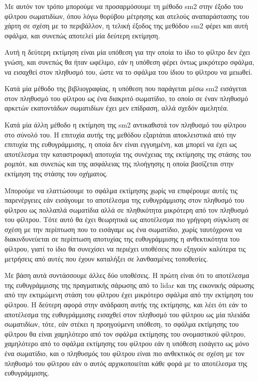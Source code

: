 \documentclass[a4paper,10pt]{article}
\begin{document}
Με αυτόν τον τρόπο μπορούμε να προσαρμόσουμε τη μέθοδο sm2 στην έξοδο του
φίλτρου σωματιδίων, όπου λόγω θορύβου μέτρησης και ατελούς αναπαράστασης του
χάρτη σε σχέση με το περιβάλλον, η τελική έξοδος της μεθόδου sm2 φέρει και αυτή
σφάλμα, και συνεπώς αποτελεί μία δεύτερη εκτίμηση.

Αυτή η δεύτερη εκτίμηση είναι μία υπόθεση για την οποία το ίδιο το φίλτρο δεν
έχει γνώση, και συνεπώς θα ήταν ωφέλιμο, εάν η υπόθεση φέρει όντως μικρότερο
σφάλμα, να εισαχθεί στον πληθυσμό του, ώστε να το σφάλμα του ίδιου το φίλτρου
να μειωθεί.

Κατά μία μέθοδο της βιβλιογραφίας, η υπόθεση που παράγεται μέσω sm2 εισάγεται
στον πληθυσμό του φίλτρου ως ένα διακριτό σωματίδιο, το οποίο σε έναν πληθυσμό
αρκετών εκατοντάδων σωματιδίων έχει μεν επίδραση, αλλά σχεδόν αμελητέα.

Κατά μία άλλη μέθοδο η εκτίμηση της sm2 αντικαθιστά τον πληθυσμό του φίλτρου
στο σύνολό του.  Η επιτυχία αυτής της μεθόδου εξαρτάται αποκλειστικά από την
επιτυχία της ευθυγράμμισης, η οποία δεν είναι εγγυημένη, και μπορεί να έχει ως
αποτέλεσμα την καταστροφική αποτυχία της συνέχειας της εκτίμησης της στάσης του
ρομπότ, και συνεπώς και της ασφάλειας της πλοήγησης η οποία βασίζεται στην
εκτίμηση της στάσης του οχήματος.

Μπορούμε να ελαττώσουμε το σφάλμα εκτίμησης χωρίς να επιφέρουμε αυτές
τις παρενέργειες εάν εισάγουμε το αποτέλεσμα της ευθυγράμμισης στον πληθυσμό
του φίλτρου ως πολλαπλά σωματίδια αλλά σε πληθικότητα μικρότερη από τον
πληθυσμό του φίλτρου. Τότε αυτό θα έχει θεωρητικά ως αποτέλεσμα πιο γρήγορη
σύγκλιση σε σχέση με την περίπτωση που το εισάγαμε ως ένα σωματίδιο, χωρίς
ταυτόχρονα να διακινδυνεύεται σε περίπτωση αποτυχίας της ευθυγράμμισης η
ανθεκτικότητα του φίλτρου, γιατί το ίδιο θα συνεχίσει να περιέχει υποθέσεις που
εξηγούν καλύτερα τις μετρήσεις από αυτές που έχουν καταλήξει σε λανθασμένες
τοποθεσίες.

Με βάση αυτά συντάσσουμε άλλες δύο υποθέσεις. Η πρώτη είναι ότι το αποτέλεσμα
της ευθυγράμμισης της πραγματικής σάρωσης από το lidar και της εικονικής
σάρωσης από την εκτιμώμενη στάση του φίλτρου έχει μικρότερο σφάλμα από την
εκτίμηση του φίλτρου.  Η δεύτερη αφορά στην ανάδραση αυτής της εκτίμησης, και
λέει ότι εάν το αποτέλεσμα της ευθυγράμμισης εισαχθεί στον πληθυσμό του φίλτρου
ως μία πλειάδα σωματιδίων, τότε, εάν στέκει η προηγούμενη υπόθεση, το σφάλμα
εκτίμησης του φίλτρου θα είναι χαμηλότερο από τον σφάλμα εκτίμησης του
ονομαστικού φίλτρου, χαμηλότερο από το σφάλμα εκτίμησης του φίλτρου εάν η
υπόθεση εισάγετο ως μόνο ένα σωματίδιο, και ο πληθυσμός του φίλτρου είναι πιο
ανθεκτικός σε σχέση με τον πληθυσμό του φίλτρου εάν ο αυτός αρχικοποιείται κάθε
φορά με το αποτέλεσμα της ευθυγράμμισης.
\end{document}
